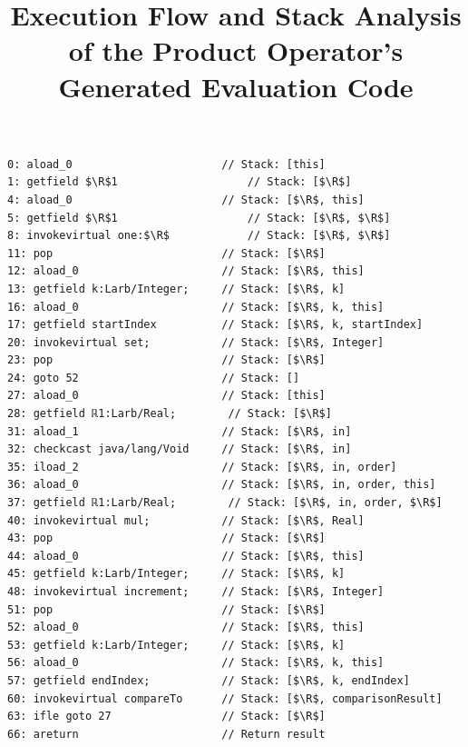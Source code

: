 \documentclass{article}
\newcommand{\R}{\ensuremath{\mathbb{R}}}
\begin{document}
\title{Execution Flow and Stack Analysis of the Product Operator's Generated Evaluation Code}
\maketitle

\begin{lstlisting}
0: aload_0                       // Stack: [this]
1: getfield $\R$1                    // Stack: [$\R$]
4: aload_0                       // Stack: [$\R$, this]
5: getfield $\R$1                    // Stack: [$\R$, $\R$]
8: invokevirtual one:$\R$            // Stack: [$\R$, $\R$] 
11: pop                          // Stack: [$\R$]
12: aload_0                      // Stack: [$\R$, this]
13: getfield k:Larb/Integer;     // Stack: [$\R$, k]
16: aload_0                      // Stack: [$\R$, k, this]
17: getfield startIndex          // Stack: [$\R$, k, startIndex]
20: invokevirtual set;           // Stack: [$\R$, Integer]
23: pop                          // Stack: [$\R$]
24: goto 52                      // Stack: []
27: aload_0                      // Stack: [this] 
28: getfield ℝ1:Larb/Real;        // Stack: [$\R$]
31: aload_1                      // Stack: [$\R$, in]
32: checkcast java/lang/Void     // Stack: [$\R$, in]
35: iload_2                      // Stack: [$\R$, in, order]
36: aload_0                      // Stack: [$\R$, in, order, this]
37: getfield ℝ1:Larb/Real;        // Stack: [$\R$, in, order, $\R$]
40: invokevirtual mul;           // Stack: [$\R$, Real] 
43: pop                          // Stack: [$\R$]
44: aload_0                      // Stack: [$\R$, this]
45: getfield k:Larb/Integer;     // Stack: [$\R$, k]
48: invokevirtual increment;     // Stack: [$\R$, Integer] 
51: pop                          // Stack: [$\R$]
52: aload_0                      // Stack: [$\R$, this]
53: getfield k:Larb/Integer;     // Stack: [$\R$, k]
56: aload_0                      // Stack: [$\R$, k, this]
57: getfield endIndex;           // Stack: [$\R$, k, endIndex]
60: invokevirtual compareTo      // Stack: [$\R$, comparisonResult]
63: ifle goto 27                 // Stack: [$\R$]
66: areturn                      // Return result
\end{lstlisting}
\end{document}
